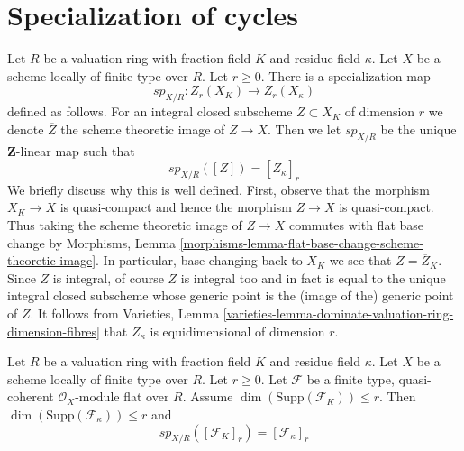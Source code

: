 \section{Specialization of cycles}
\label{section-specialization}

\noindent
Let $R$ be a valuation ring with fraction field $K$ and residue field $\kappa$.
Let $X$ be a scheme locally of finite type over $R$. Let $r \geq 0$.
There is a specialization map
$$
sp_{X/R} : Z_r(X_K) \longrightarrow Z_r(X_\kappa)
$$
defined as follows. For an integral closed subscheme $Z \subset X_K$
of dimension $r$ we denote $\overline{Z}$ the scheme theoretic image
of $Z \to X$. Then we let $sp_{X/R}$ be the unique $\mathbf{Z}$-linear
map such that
$$
sp_{X/R}([Z]) = [\overline{Z}_\kappa]_r
$$
We briefly discuss why this is well defined. First, observe that the
morphism $X_K \to X$ is quasi-compact and hence the morphism $Z \to X$
is quasi-compact. Thus taking the scheme theoretic image of $Z \to X$
commutes with flat base change by
Morphisms, Lemma \ref{morphisms-lemma-flat-base-change-scheme-theoretic-image}.
In particular, base changing back to $X_K$ we see that $Z = \overline{Z}_K$.
Since $Z$ is integral, of course $\overline{Z}$ is integral too and
in fact is equal to the unique integral closed subscheme whose generic
point is the (image of the) generic point of $Z$. It follows from
Varieties, Lemma \ref{varieties-lemma-dominate-valuation-ring-dimension-fibres}
that $Z_\kappa$ is equidimensional of dimension $r$.

\begin{lemma}
\label{lemma-specialization-module}
Let $R$ be a valuation ring with fraction field $K$ and residue field $\kappa$.
Let $X$ be a scheme locally of finite type over $R$. Let $r \geq 0$.
Let $\mathcal{F}$ be a finite type, quasi-coherent $\mathcal{O}_X$-module
flat over $R$. Assume $\dim(\text{Supp}(\mathcal{F}_K)) \leq r$.
Then $\dim(\text{Supp}(\mathcal{F}_\kappa)) \leq r$ and
$$
sp_{X/R}([\mathcal{F}_K]_r) = [\mathcal{F}_\kappa]_r
$$
\end{lemma}

